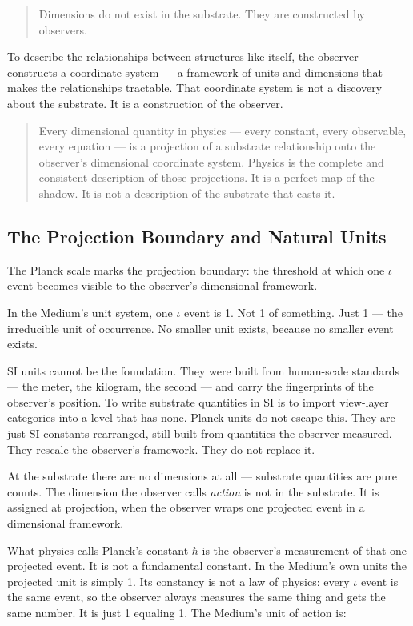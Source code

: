 \documentclass[11pt,letterpaper]{article}
\begin{document}
\begin{quote}
Dimensions do not exist in the substrate. They are constructed by observers.
\end{quote}

To describe the relationships between structures like itself, the observer constructs a coordinate system --- a framework of units and dimensions that makes the relationships tractable. That coordinate system is not a discovery about the substrate. It is a construction of the observer.

\begin{quote}
Every dimensional quantity in physics --- every constant, every observable, every equation --- is a projection of a substrate relationship onto the observer's dimensional coordinate system. Physics is the complete and consistent description of those projections. It is a perfect map of the shadow. It is not a description of the substrate that casts it.
\end{quote}

\subsection{The Projection Boundary and Natural Units}
\label{sec:orgf696355}

The Planck scale marks the projection boundary: the threshold at which one \(\iota\) event becomes visible to the observer's dimensional framework.

In the Medium's unit system, one \(\iota\) event is 1. Not 1 of something. Just 1 --- the irreducible unit of occurrence. No smaller unit exists, because no smaller event exists.

SI units cannot be the foundation. They were built from human-scale standards --- the meter, the kilogram, the second --- and carry the fingerprints of the observer's position. To write substrate quantities in SI is to import view-layer categories into a level that has none. Planck units do not escape this. They are just SI constants rearranged, still built from quantities the observer measured. They rescale the observer's framework. They do not replace it.

At the substrate there are no dimensions at all --- substrate quantities are pure counts. The dimension the observer calls \emph{action} is not in the substrate. It is assigned at projection, when the observer wraps one projected event in a dimensional framework.

What physics calls Planck's constant \(\hbar\) is the observer's measurement of that one projected event. It is not a fundamental constant. In the Medium's own units the projected unit is simply 1. Its constancy is not a law of physics: every \(\iota\) event is the same event, so the observer always measures the same thing and gets the same number. It is just 1 equaling 1. The Medium's unit of action is:
\end{document}
